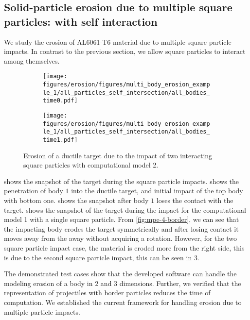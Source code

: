 \FloatBarrier%
\subsection{Solid-particle erosion due to multiple square particles: with
  self interaction}
\label{sec:erosion-multiple-impact-self-interact}
We study the erosion of AL6061-T6 material due to multiple square particle
impacts. In contrast to the previous section, we allow square particles to
interact among themselves.

\begin{figure}[!htpb]
  \centering
  \begin{subfigure}{0.48\textwidth}
    \centering
    \texttt{[image: figures/erosion/figures/multi\_body\_erosion\_example\_1/all\_particles\_self\_intersection/all\_bodies\_time0.pdf]}
    \subcaption{}
    \label{fig:mpe-1-full-a}
  \end{subfigure}
  \begin{subfigure}{0.48\textwidth}
    \centering
    \texttt{[image: figures/erosion/figures/multi\_body\_erosion\_example\_1/all\_particles\_self\_intersection/all\_bodies\_time1.pdf]}
    \subcaption{}
    \label{fig:mpe-1-full-b}
  \end{subfigure}
  \caption{Erosion of a ductile target due to the impact of two interacting
    square particles with computational model 2.}
\label{fig:mpe-1-full}
\end{figure}
 shows the snapshot of the target during the square
particle impacts.  shows the penetration of body $1$
into the ductile target, and initial impact of the top body with bottom one.
 shows the snapshot after body $1$ loses the contact
with the target.  shows the snapshot of the target during
the impact for the computational model 1 with a single square particle. From
\cref{fig:mpe-4-border}, we can see that the impacting body erodes the target
symmetrically and after losing contact it moves away from the away without
acquiring a rotation. However, for the two square particle impact case, the
material is eroded more from the right side, this is due to the second square
particle impact, this can be seen in \cref{fig:mpe-1-full}.



The demonstrated test cases show that the developed software can handle the
modeling erosion of a body in 2 and 3 dimensions. Further, we verified that the
representation of projectiles with border particles reduces the time of
computation. We established the current framework for handling erosion due to
multiple particle impacts.
